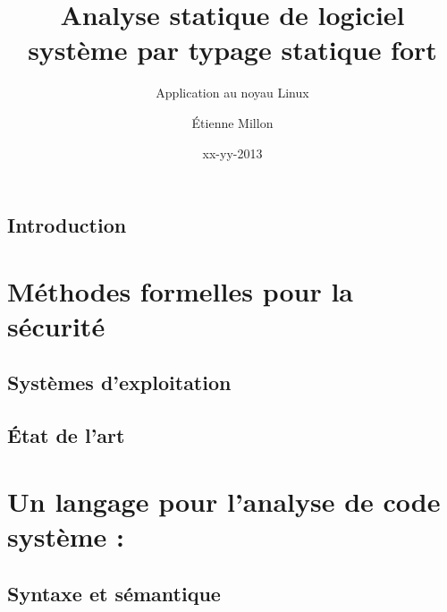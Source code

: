 \documentclass[a4paper,11pt]{memoir}
\title{Analyse statique de logiciel système par typage statique fort}
\subtitle{Application au noyau Linux}
\author{Étienne Millon}
\date{xx-yy-2013}
\begin{document}
\frontmatter

\begin{titlingpage}
\titleUL{}
\end{titlingpage}

\cleartorecto


%


\tableofcontents

\mainmatter

\chapter{Introduction}

\label{cha:intro}



\part{Méthodes formelles pour la sécurité}
\label{part:ctx}



\chapter{Systèmes d'exploitation}

\label{cha:os}



%

\chapter{État de l'art}

\label{cha:etatdelart}




\part{Un langage pour l'analyse de code système : \langname}
\label{part:lang}



\chapter{Syntaxe et sémantique}
\end{document}
